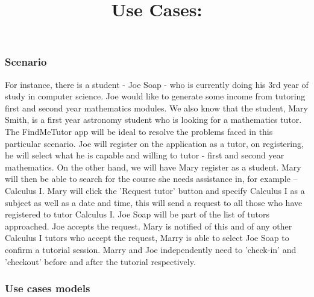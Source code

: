 \documentclass[12pt]{article}
\begin{document}
\subsubsection{Scenario}
\begin{flushleft}

For instance, there is a student - Joe Soap - who is currently doing his 3rd year of study in computer science. Joe would like to generate some income from tutoring first and second year mathematics modules. We also know that the student, Mary Smith, is a first year astronomy student who is looking for a mathematics tutor. The FindMeTutor app will be ideal to resolve the problems faced in this particular scenario. Joe will register on the application as a tutor, on registering, he will select what he is capable and willing to tutor - first and second year mathematics. On the other hand, we will have Mary register as a student. Mary will then be able to search for the course she needs assistance in, for example – Calculus I. Mary will click the 'Request tutor' button and specify Calculus I as a subject as well as a date and time, this will send a request to all those who have registered to tutor Calculus I. Joe Soap will be part of the list of tutors approached. Joe accepts the request. Mary is notified of this and of any other Calculus I tutors who accept the request, Marry is able to select Joe Soap to confirm a tutorial session. Marry and Joe independently need to 'check-in' and 'checkout' before and after the tutorial respectively.
\end{flushleft}


\subsubsection{Use cases models}

\title{\textbf{Use Cases: }}\\ \\
\end{document}
